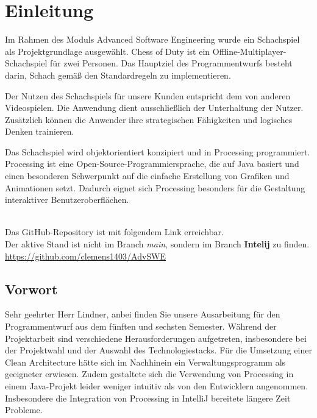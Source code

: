 \chapter{Einleitung}

Im Rahmen des Moduls \glqq Advanced Software Engineering\grqq{} wurde ein Schachspiel als Projektgrundlage ausgewählt. 
Chess of Duty ist ein Offline-Multiplayer-Schachspiel für zwei Personen. 
Das Hauptziel des Programmentwurfs besteht darin, Schach gemäß den Standardregeln zu implementieren. 

Der Nutzen des Schachspiels für unsere Kunden entspricht dem von anderen Videospielen. 
Die Anwendung dient ausschließlich der Unterhaltung der Nutzer. 
Zusätzlich können die Anwender ihre strategischen Fähigkeiten und logisches Denken trainieren.

Das Schachspiel wird objektorientiert konzipiert und in Processing programmiert. 
Processing ist eine Open-Source-Programmiersprache, die auf Java basiert und einen besonderen Schwerpunkt auf die einfache Erstellung von Grafiken und Animationen setzt. 
Dadurch eignet sich Processing besonders für die Gestaltung interaktiver Benutzeroberflächen. 

\begin{balken}
    \tip
    \\
    Das GitHub-Repository ist mit folgendem Link erreichbar. \\ 
    Der aktive Stand ist nicht im Branch \textit{main}, sondern im Branch \textbf{Intelij} zu finden.\\
    \url{https://github.com/clemens1403/AdvSWE}
\end{balken}

\section{Vorwort}

Sehr geehrter Herr Lindner, anbei finden Sie unsere Ausarbeitung für den Programmentwurf aus dem fünften und sechsten Semester. 
Während der Projektarbeit sind verschiedene Herausforderungen aufgetreten, insbesondere bei der Projektwahl und der Auswahl des Technologiestacks. 
Für die Umsetzung einer Clean Architecture hätte sich im Nachhinein ein Verwaltungsprogramm als geeigneter erwiesen. 
Zudem gestaltete sich die Verwendung von Processing in einem Java-Projekt leider weniger intuitiv als von den Entwicklern angenommen. 
Insbesondere die Integration von Processing in IntelliJ bereitete längere Zeit Probleme.

